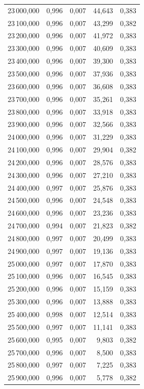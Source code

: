 \begin{longtable}{rrrrr}
23\,000,000 & 0,996 & 0,007 & 44,643 & 0,383\\
23\,100,000 & 0,996 & 0,007 & 43,299 & 0,382\\
23\,200,000 & 0,996 & 0,007 & 41,972 & 0,383\\
23\,300,000 & 0,996 & 0,007 & 40,609 & 0,383\\
23\,400,000 & 0,996 & 0,007 & 39,300 & 0,383\\
23\,500,000 & 0,996 & 0,007 & 37,936 & 0,383\\
23\,600,000 & 0,996 & 0,007 & 36,608 & 0,383\\
23\,700,000 & 0,996 & 0,007 & 35,261 & 0,383\\
23\,800,000 & 0,996 & 0,007 & 33,918 & 0,383\\
23\,900,000 & 0,996 & 0,007 & 32,566 & 0,383\\
24\,000,000 & 0,996 & 0,007 & 31,229 & 0,383\\
24\,100,000 & 0,996 & 0,007 & 29,904 & 0,382\\
24\,200,000 & 0,996 & 0,007 & 28,576 & 0,383\\
24\,300,000 & 0,996 & 0,007 & 27,210 & 0,383\\
24\,400,000 & 0,997 & 0,007 & 25,876 & 0,383\\
24\,500,000 & 0,996 & 0,007 & 24,548 & 0,383\\
24\,600,000 & 0,996 & 0,007 & 23,236 & 0,383\\
24\,700,000 & 0,994 & 0,007 & 21,823 & 0,382\\
24\,800,000 & 0,997 & 0,007 & 20,499 & 0,383\\
24\,900,000 & 0,997 & 0,007 & 19,136 & 0,383\\
25\,000,000 & 0,997 & 0,007 & 17,870 & 0,383\\
25\,100,000 & 0,996 & 0,007 & 16,545 & 0,383\\
25\,200,000 & 0,996 & 0,007 & 15,159 & 0,383\\
25\,300,000 & 0,996 & 0,007 & 13,888 & 0,383\\
25\,400,000 & 0,998 & 0,007 & 12,514 & 0,383\\
25\,500,000 & 0,997 & 0,007 & 11,141 & 0,383\\
25\,600,000 & 0,995 & 0,007 & 9,803 & 0,382\\
25\,700,000 & 0,996 & 0,007 & 8,500 & 0,383\\
25\,800,000 & 0,997 & 0,007 & 7,225 & 0,383\\
25\,900,000 & 0,996 & 0,007 & 5,778 & 0,382\\

\end{longtable}
